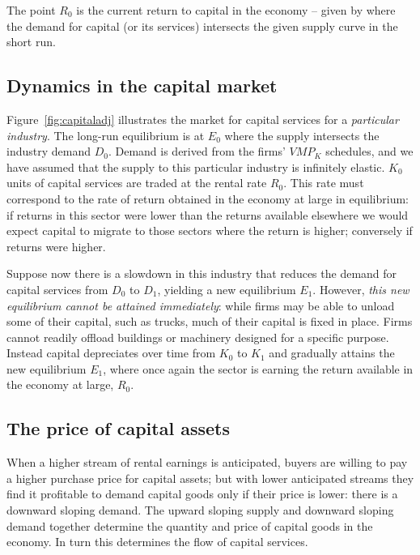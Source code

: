The point $R_0$ is the current return to capital in the economy -- given by where the demand for capital (or its services) intersects the given supply curve in the short run.

\subsection*{Dynamics in the capital market}

Figure~\ref{fig:capitaladj} illustrates the market for capital services for a \textit{particular industry}. The long-run equilibrium is at $E_0$ where the supply intersects the industry demand $D_0$. Demand is derived from the firms' $VMP_K$ schedules, and we have assumed that the supply to this particular industry is infinitely elastic. $K_0$ units of capital services are traded at the rental rate $R_0$. This rate must correspond to the rate of return obtained in the economy at large in equilibrium: if returns in this sector were lower than the returns available elsewhere we would expect capital to migrate to those sectors where the return is higher; conversely if returns were higher.



Suppose now there is a slowdown in this industry that reduces the demand for capital services from $D_0$ to $D_1$, yielding a new equilibrium $E_1$. However, \textit{this new equilibrium cannot be attained immediately}: while firms may be able to unload some of their capital, such as trucks, much of their capital is fixed in place. Firms cannot readily offload buildings or machinery designed for a specific purpose. Instead capital depreciates over time from $K_0$ to $K_1$ and gradually attains the new equilibrium $E_1$, where once again the sector is earning the return available in the economy at large, $R_0$.

\subsection*{The price of capital assets}

When a higher stream of rental earnings is anticipated, buyers are willing to pay a higher purchase price for capital assets; but with lower anticipated streams they find it profitable to demand capital goods only if their price is lower: there is a downward sloping demand. The upward sloping supply and downward sloping demand together determine the quantity and price of capital goods in the economy. In turn this determines the flow of capital services.

